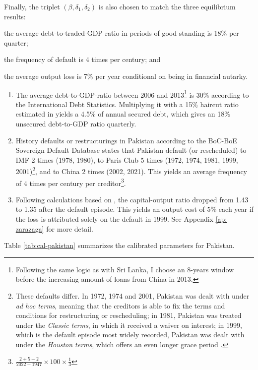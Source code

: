 Finally, the triplet $\left( \beta, \delta_1, \delta_2 \right)$ is also chosen to match the three equilibrium results:
\begin{enumerate*}[label = (\roman*)]
    \item the average debt-to-traded-GDP ratio in periods of good standing is 18\% per quarter;
    \item the frequency of default is 4 times per century; and
    \item the average output loss is 7\% per year conditional on being in financial autarky.
\end{enumerate*}
\begin{enumerate}[label = (\roman*)]
    \item
The average debt-to-GDP-ratio between 2006 and 2013\footnote{
    Following the same logic as with Sri Lanka, I choose an 8-years window before the increasing amount of loans from China in 2013.}
is 30\% according to the International Debt Statistics. Multiplying it with a 15\% haircut ratio estimated in \citet{Cruces-Trebesch-13} yields a 4.5\% of annual secured debt, which gives an 18\% unsecured debt-to-GDP ratio quarterly.
    \item History defaults or restructurings in Pakistan according to the BoC-BoE Sovereign Default Database states that Pakistan default (or rescheduled) to IMF 2 times (1978, 1980), to Paris Club 5 times (1972, 1974, 1981, 1999, 2001)\footnote{
        These defaults differ. In 1972, 1974 and 2001, Pakistan was dealt with under \emph{ad hoc terms}, meaning that the creditors is able to fix the terms and conditions for restructuring or rescheduling; in 1981, Pakistan was treated under the \emph{Classic terms}, in which it received a waiver on interest; in 1999, which is the default episode most widely recorded, Pakistan was dealt with under the \emph{Houston terms}, which offers an even longer grace period \citep{pakistan-default-start}.
    }, and to China 2 times (2002, 2021). This yields an average frequency of 4 times per century per creditor\footnote{$\frac{2+5+2}{2022 - 1947}\times 100 \times \frac{1}{3}$}.
    \item
    Following calculations based on \citet*{zarazaga-12}, the capital-output ratio dropped from 1.43 to 1.35 after the default episode. This yields an output cost of 5\% each year if the loss is attributed solely on the default in 1999. See Appendix \ref{ap: zarazaga} for more detail.
\end{enumerate}
Table \ref{tab:cal-pakistan} summarizes the calibrated parameters for Pakistan.
